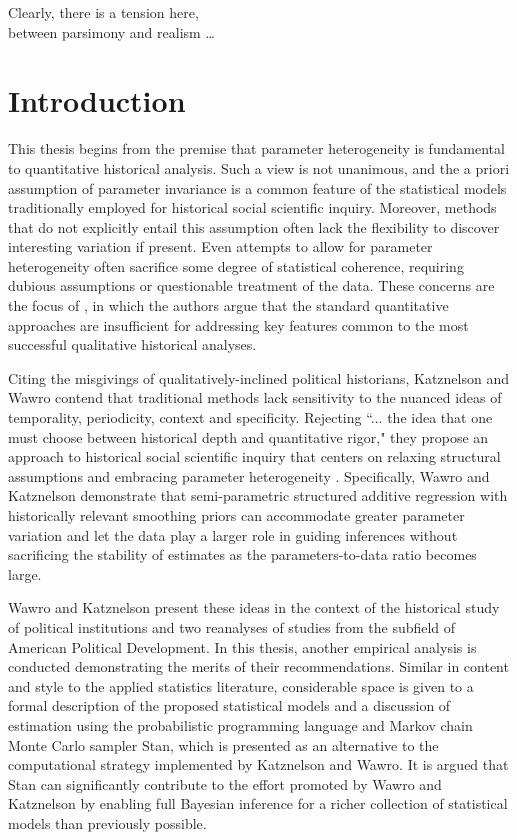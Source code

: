 \begin{savequote}[0.4\linewidth]
\singlespacing
\noindent Clearly, there is a tension here, \\ \noindent between parsimony and realism \dots
{}
\end{savequote}

\chapter{Introduction}
\label{introduction}

This thesis begins from the premise that parameter heterogeneity is fundamental to quantitative 
historical analysis. Such a view is not unanimous, and the a priori assumption of 
parameter invariance is a common feature of the statistical models traditionally employed for 
historical social scientific inquiry. Moreover, methods that do not explicitly entail this assumption 
often lack the flexibility to discover interesting variation if present. Even attempts to allow for parameter 
heterogeneity often sacrifice some degree of statistical coherence, requiring dubious 
assumptions or questionable treatment of the data. These concerns are the focus of 
, in which the authors argue that the standard quantitative 
approaches are insufficient for addressing key features common to the most successful 
qualitative historical analyses. 

Citing the misgivings of qualitatively-inclined political historians, Katznelson and Wawro 
contend that traditional methods lack sensitivity to the nuanced ideas of temporality, periodicity, 
context and specificity. Rejecting 
``... the idea that one must choose between historical depth and quantitative rigor," 
they propose an approach to historical social scientific inquiry that centers on relaxing structural 
assumptions and embracing parameter heterogeneity 
. Specifically, 
Wawro and Katznelson demonstrate that semi-parametric structured additive regression 
with historically relevant smoothing priors can accommodate greater parameter variation 
and let the data play a larger role in guiding inferences without sacrificing the stability of 
estimates as the parameters-to-data ratio becomes large.  

Wawro and Katznelson present these ideas in the context of the historical study of political 
institutions and two reanalyses of studies from the subfield of American Political 
Development. In this thesis, another empirical analysis is conducted demonstrating the merits 
of their recommendations. Similar in content and style to the applied statistics literature, 
considerable space is given to a formal description of the proposed statistical models and 
a discussion of estimation using the probabilistic programming 
language and Markov chain Monte Carlo sampler Stan, which is presented as an alternative to 
the computational strategy implemented by Katznelson and Wawro. It is argued that Stan can 
significantly contribute to the effort promoted by Wawro and Katznelson by enabling full Bayesian 
inference for a richer collection of statistical models than previously possible. 
